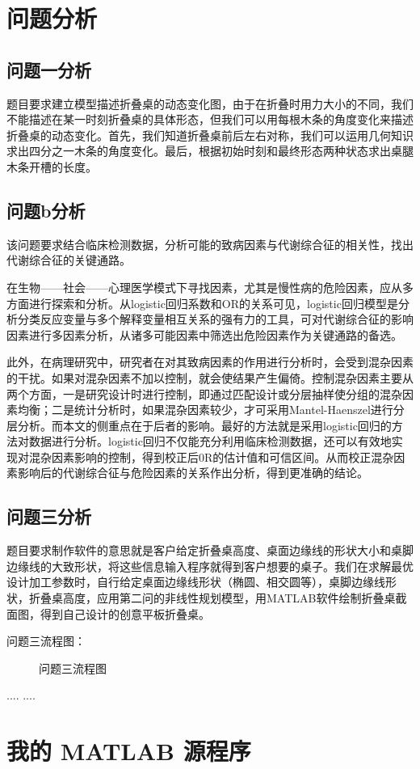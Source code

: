 \documentclass[bwprint]{cumcmthesis}
\begin{document}
\section{问题分析}
\subsection{问题一分析}
题目要求建立模型描述折叠桌的动态变化图，由于在折叠时用力大小的不同，我们不能描述在某一时刻折叠桌的具体形态，但我们可以用每根木条的角度变化来描述折叠桌的动态变化。首先，我们知道折叠桌前后左右对称，我们可以运用几何知识求出四分之一木条的角度变化。最后，根据初始时刻和最终形态两种状态求出桌腿木条开槽的长度。
\subsection{问题b分析}
该问题要求结合临床检测数据，分析可能的致病因素与代谢综合征的相关性，找出代谢综合征的关键通路。

在生物——社会——心理医学模式下寻找因素，尤其是慢性病的危险因素，应从多方面进行探索和分析。从logistic回归系数和OR的关系可见，logistic回归模型是分析分类反应变量与多个解释变量相互关系的强有力的工具，可对代谢综合征的影响因素进行多因素分析，从诸多可能因素中筛选出危险因素作为关键通路的备选。

此外，在病理研究中，研究者在对其致病因素的作用进行分析时，会受到混杂因素的干扰。如果对混杂因素不加以控制，就会使结果产生偏倚。控制混杂因素主要从两个方面，一是研究设计时进行控制，即通过匹配设计或分层抽样使分组的混杂因素均衡；二是统计分析时，如果混杂因素较少，才可采用Mantel-Haenszel进行分层分析。而本文的侧重点在于后者的影响。最好的方法就是采用logistic回归的方法对数据进行分析。logistic回归不仅能充分利用临床检测数据，还可以有效地实现对混杂因素影响的控制，得到校正后0R的估计值和可信区间。从而校正混杂因素影响后的代谢综合征与危险因素的关系作出分析，得到更准确的结论。
\subsection{问题三分析}
题目要求制作软件的意思就是客户给定折叠桌高度、桌面边缘线的形状大小和桌脚边缘线的大致形状，将这些信息输入程序就得到客户想要的桌子。我们在求解最优设计加工参数时，自行给定桌面边缘线形状（椭圆、相交圆等），桌脚边缘线形状，折叠桌高度，应用第二问的非线性规划模型，用MATLAB软件绘制折叠桌截面图，得到自己设计的创意平板折叠桌。

问题三流程图：
\begin{figure}[!h]
\centering
\caption{问题三流程图}
\end{figure}
\begin{thebibliography}{9}
  ....
  ....
\end{thebibliography}
\appendix
\section{我的 MATLAB 源程序}
\end{document}
